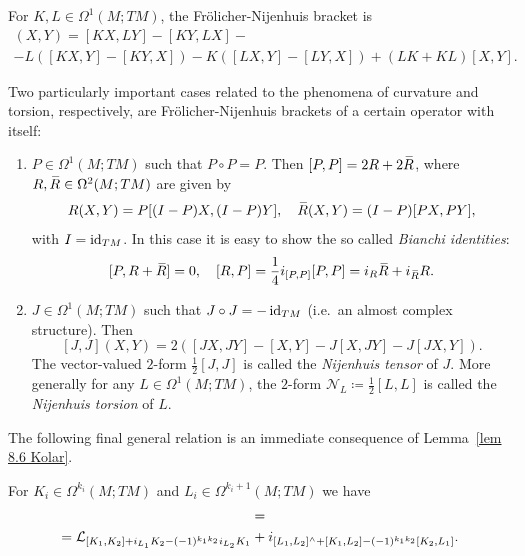 \begin{lem}
    For $K,L\in\Omega^1(M;TM)$, the Fr\"olicher-Nijenhuis bracket is 
    \begin{multline}
        [K,L](X,Y)=[KX,LY]-[KY,LX]-\\-L([KX,Y]-[KY,X])-K([LX,Y]-[LY,X])+(LK+KL)[X,Y].
    \end{multline}
\end{lem}

\begin{rem}\label{ex frolicher curvature and torsion}
    Two particularly important cases related to the phenomena of curvature and torsion, respectively, are  Fr\"olicher-Nijenhuis brackets of a certain operator with itself:
    \begin{enumerate}
        \item $P\in\Omega^1(M;TM)$ such that $P\circ P=P$. Then $[P,P]=2R+2\wb{R}$, where $R,\wb{R}\in\Omega^2(M;TM)$ are given by 
        \[R(X,Y)=P[(I-P)X,(I-P)Y],\quad \wb{R}(X,Y)=(I-P)[PX,PY],\]
        with $I=\operatorname{id}_{TM}$. In this case it is easy to show the so called \emph{Bianchi identities}: 
        \[[P,R+\wb{R}]=0,\quad [R,P]=\frac14i_{[P,P]}[P,P]=i_R \wb{R}+i_{\wb{R}}R.\]
        \item $J\in\Omega^1(M;TM)$ such that $J\circ J=-\operatorname{id}_{TM}$ (i.e.~an almost complex structure). Then 
        \[[J,J](X,Y)=2([JX,JY]-[X,Y]-J[X,JY]-J[JX,Y]).\]
        The vector-valued $2$-form $\frac{1}{2}[J,J]$ is called the \emph{Nijenhuis tensor} of $J$. More generally for any $L\in \Omega^1(M;TM)$, the $2$-form $\mathcal{N}_L\coloneqq \frac12[L,L]$ is called the \emph{Nijenhuis torsion} of $L$.
    \end{enumerate}
\end{rem}


The following final general relation is an immediate consequence of Lemma~\ref{lem 8.6 Kolar}.

\begin{thm}
    For $K_i\in\Omega^{k_i}(M;TM)$ and $L_i\in\Omega^{k_i+1}(M;TM)$ we have 
    \begin{multline}
        [\Lie_{K_1}+i_{L_1},\Lie_{K_2}+i_{L_2}]=\\
        =\Lie_{[K_1,K_2]+i_{L_1}K_2-(-1)^{k_1k_2}i_{L_2}K_1}+
        i_{[L_1,L_2]^{\wedge}+[K_1,L_2]-(-1)^{k_1k_2}[K_2,L_1]}.
    \end{multline}
\end{thm}

